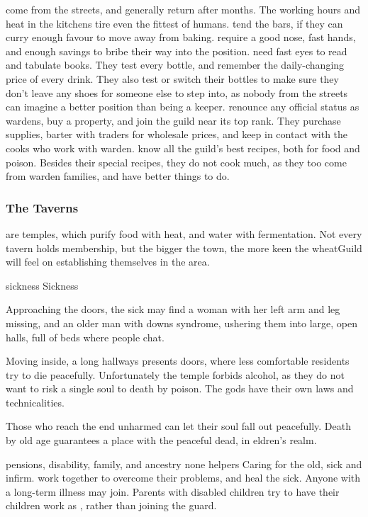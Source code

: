 \begin{multicols}{2}
\begin{description}
  come from the streets, and generally return after months.
  The working hours and heat in the kitchens tire even the fittest of humans.
  tend the bars, if they can curry enough favour to move away from baking.
  require a good nose, fast hands, and enough savings to bribe their way into the position.
  need fast eyes to read and tabulate books.
  They test every bottle, and remember the daily-changing price of every drink.
  They also test or switch their bottles to make sure they don't leave any shoes for someone else to step into, as nobody from the streets can imagine a better position than being a keeper.
  renounce any official status as \glspl{warden}, buy a property, and join the guild near its top rank.
  They purchase supplies, barter with traders for wholesale prices, and keep in contact with the cooks who work with \gls{warden}.
  know all the guild's best recipes, both for food and poison.
  Besides their special recipes, they do not cook much, as they too come from \gls{warden} families, and have better things to do.
\end{description}

\null
\subsubsection{The Taverns}
are temples, which purify food with heat, and water with fermentation.
Not every tavern holds membership, but the bigger the town, the more keen the \gls{wheatGuild} will feel on establishing themselves in the area.

  {\gls{sickness}}%
  {Sickness}%
  {
    Approaching the doors, the sick may find a woman with her left arm and leg missing, and an older man with downs syndrome, ushering them into large, open halls, full of beds where people chat.

    Moving inside, a long hallways presents doors, where less comfortable residents try to die peacefully.
    Unfortunately the temple forbids alcohol, as they do not want to risk a single soul to death by poison.
    The gods have their own laws and technicalities.

    Those who reach the end unharmed can let their soul fall out peacefully.
    Death by old age guarantees a place with the peaceful dead, in \gls{eldren}'s realm.
  }%
  {pensions, disability, family, and ancestry}%
  {none}%
  {\Glspl{helper}}%
  {
    Caring for the old, sick and infirm.
  }%
work together to overcome their problems, and heal the sick.
Anyone with a long-term illness may join.
Parents with disabled children try to have their children work as , rather than joining the \gls{guard}.


\end{multicols}
